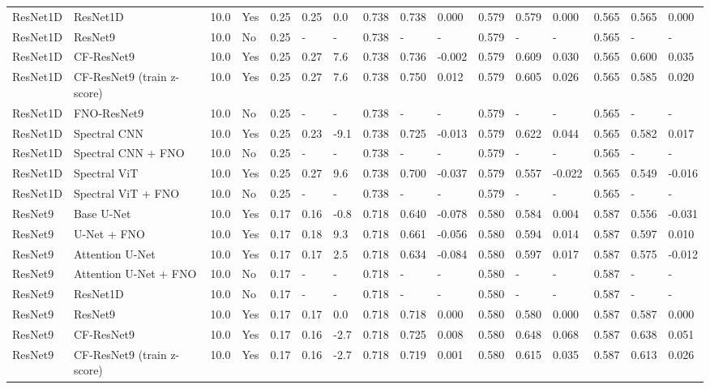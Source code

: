 \begin{longtable}{llllllllllllllll}
ResNet1D & ResNet1D & 10.0 & Yes & 0.25 & 0.25 & 0.0 & 0.738 & 0.738 & 0.000 & 0.579 & 0.579 & 0.000 & 0.565 & 0.565 & 0.000 \\
ResNet1D & ResNet9 & 10.0 & No & 0.25 & - & - & 0.738 & - & - & 0.579 & - & - & 0.565 & - & - \\
ResNet1D & CF-ResNet9 & 10.0 & Yes & 0.25 & 0.27 & 7.6 & 0.738 & 0.736 & -0.002 & 0.579 & 0.609 & 0.030 & 0.565 & 0.600 & 0.035 \\
ResNet1D & CF-ResNet9 (train z-score) & 10.0 & Yes & 0.25 & 0.27 & 7.6 & 0.738 & 0.750 & 0.012 & 0.579 & 0.605 & 0.026 & 0.565 & 0.585 & 0.020 \\
ResNet1D & FNO-ResNet9 & 10.0 & No & 0.25 & - & - & 0.738 & - & - & 0.579 & - & - & 0.565 & - & - \\
ResNet1D & Spectral CNN & 10.0 & Yes & 0.25 & 0.23 & -9.1 & 0.738 & 0.725 & -0.013 & 0.579 & 0.622 & 0.044 & 0.565 & 0.582 & 0.017 \\
ResNet1D & Spectral CNN + FNO & 10.0 & No & 0.25 & - & - & 0.738 & - & - & 0.579 & - & - & 0.565 & - & - \\
ResNet1D & Spectral ViT & 10.0 & Yes & 0.25 & 0.27 & 9.6 & 0.738 & 0.700 & -0.037 & 0.579 & 0.557 & -0.022 & 0.565 & 0.549 & -0.016 \\
ResNet1D & Spectral ViT + FNO & 10.0 & No & 0.25 & - & - & 0.738 & - & - & 0.579 & - & - & 0.565 & - & - \\
ResNet9 & Base U-Net & 10.0 & Yes & 0.17 & 0.16 & -0.8 & 0.718 & 0.640 & -0.078 & 0.580 & 0.584 & 0.004 & 0.587 & 0.556 & -0.031 \\
ResNet9 & U-Net + FNO & 10.0 & Yes & 0.17 & 0.18 & 9.3 & 0.718 & 0.661 & -0.056 & 0.580 & 0.594 & 0.014 & 0.587 & 0.597 & 0.010 \\
ResNet9 & Attention U-Net & 10.0 & Yes & 0.17 & 0.17 & 2.5 & 0.718 & 0.634 & -0.084 & 0.580 & 0.597 & 0.017 & 0.587 & 0.575 & -0.012 \\
ResNet9 & Attention U-Net + FNO & 10.0 & No & 0.17 & - & - & 0.718 & - & - & 0.580 & - & - & 0.587 & - & - \\
ResNet9 & ResNet1D & 10.0 & No & 0.17 & - & - & 0.718 & - & - & 0.580 & - & - & 0.587 & - & - \\
ResNet9 & ResNet9 & 10.0 & Yes & 0.17 & 0.17 & 0.0 & 0.718 & 0.718 & 0.000 & 0.580 & 0.580 & 0.000 & 0.587 & 0.587 & 0.000 \\
ResNet9 & CF-ResNet9 & 10.0 & Yes & 0.17 & 0.16 & -2.7 & 0.718 & 0.725 & 0.008 & 0.580 & 0.648 & 0.068 & 0.587 & 0.638 & 0.051 \\
ResNet9 & CF-ResNet9 (train z-score) & 10.0 & Yes & 0.17 & 0.16 & -2.7 & 0.718 & 0.719 & 0.001 & 0.580 & 0.615 & 0.035 & 0.587 & 0.613 & 0.026 \\

\end{longtable}
